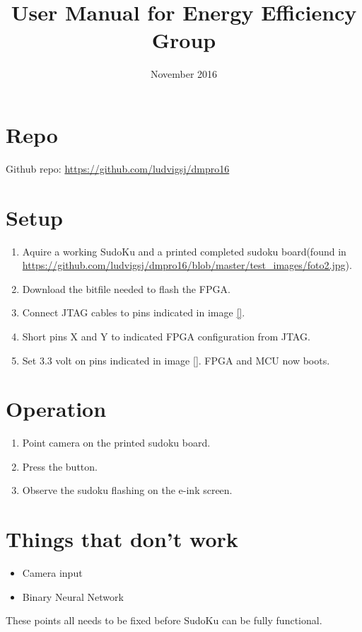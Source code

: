 \documentclass{article}
\title{User Manual for Energy Efficiency Group}
\date{November 2016}
\begin{document}
\maketitle

\section*{Repo}
Github repo: \url{https://github.com/ludvigsj/dmpro16}

\section*{Setup}

\begin{enumerate}
    \item Aquire a working SudoKu and a printed completed sudoku board(found in \url{https://github.com/ludvigsj/dmpro16/blob/master/test_images/foto2.jpg}).
    \item Download the bitfile needed to flash the FPGA.
    \item Connect JTAG cables to pins indicated in image \ref{}.
    \item Short pins X and Y to indicated FPGA configuration from JTAG.
    \item Set 3.3 volt on pins indicated in image \ref{}. \newline
          FPGA and MCU now boots.
\end{enumerate}

\section*{Operation}
\begin{enumerate}
    \item Point camera on the printed sudoku board.
    \item Press the button.
    \item Observe the sudoku flashing on the e-ink screen.
\end{enumerate}

\section*{Things that don't work}
\begin{itemize}
    \item Camera input
    \item Binary Neural Network
\end{itemize}
These points all needs to be fixed before SudoKu can be fully functional.
\end{document}
